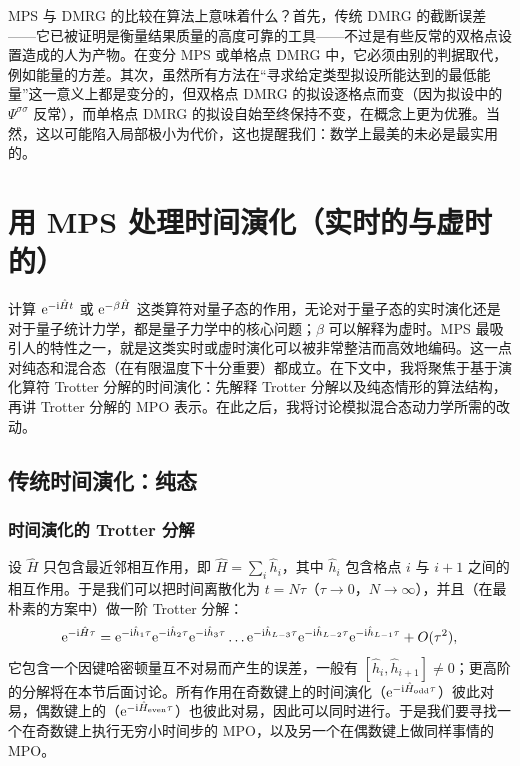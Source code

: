 \documentclass[a4paper,10pt,oneside,onecolumn,1p,times]{elsarticle}
\newcommand{\eul}{{\rm e }}
\newcommand{\imag}{{\rm i }}
\begin{document}
MPS 与 DMRG 的比较在算法上意味着什么？首先，传统 DMRG 的截断误差——它已被证明是衡量结果质量的高度可靠的工具——不过是有些反常的双格点设置造成的人为产物。在变分 MPS 或单格点 DMRG 中，它必须由别的判据取代，例如能量的方差。其次，虽然所有方法在``寻求给定类型拟设所能达到的最低能量''这一意义上都是变分的，但双格点 DMRG 的拟设逐格点而变（因为拟设中的 $\Psi^{\sigma\sigma}$ 反常），而单格点 DMRG 的拟设自始至终保持不变，在概念上更为优雅。当然，这以可能陷入局部极小为代价，这也提醒我们：数学上最美的未必是最实用的。
 
\section{用 MPS 处理时间演化（实时的与虚时的）}
计算 $\eul^{-\imag \hat{H}t}$ 或 $\eul^{-\beta\hat{H}}$ 这类算符对量子态的作用，无论对于量子态的实时演化还是对于量子统计力学，都是量子力学中的核心问题；$\beta$ 可以解释为虚时。MPS 最吸引人的特性之一，就是这类实时或虚时演化可以被非常整洁而高效地编码。这一点对纯态和混合态（在有限温度下十分重要）都成立。在下文中，我将聚焦于基于演化算符 Trotter 分解的时间演化\cite{Vidal03a,Vidal04b,Daley04,WhiteFeiguin04,VerstraeteRipoll04}：先解释 Trotter 分解以及纯态情形的算法结构，再讲 Trotter 分解的 MPO 表示。在此之后，我将讨论模拟混合态动力学所需的改动。
\subsection{传统时间演化：纯态}

\subsubsection{时间演化的 Trotter 分解}
设 $\hat{H}$ 只包含最近邻相互作用，即 $\hat{H} = \sum_i \hat{h}_i$，其中 $\hat{h}_i$ 包含格点 $i$ 与 $i+1$ 之间的相互作用。于是我们可以把时间离散化为 $t = N \tau$（$\tau\rightarrow 0$，$N \rightarrow \infty$），并且（在最朴素的方案中）做一阶 Trotter 分解：
\begin{equation}
\eul^{-\imag \hat{H}\tau} = \eul^{-\imag  \hat{h}_1 \tau}\eul^{-\imag  \hat{h}_2 \tau}\eul^{-\imag  \hat{h}_3 \tau} \ldots  \eul^{-\imag  \hat{h}_{L-3} \tau}\eul^{-\imag  \hat{h}_{L-2} \tau}\eul^{-\imag  \hat{h}_{L-1} \tau} + O(\tau^2),
\end{equation}
它包含一个因键哈密顿量互不对易而产生的误差，一般有 $[ \hat{h}_i,\hat{h}_{i+1}] \neq 0$；更高阶的分解将在本节后面讨论。所有作用在奇数键上的时间演化（$\eul^{-\imag \hat{H}_{{\rm odd}} \tau}$）彼此对易，偶数键上的（$\eul^{-\imag \hat{H}_{{\rm even}} \tau}$）也彼此对易，因此可以同时进行。于是我们要寻找一个在奇数键上执行无穷小时间步的 MPO，以及另一个在偶数键上做同样事情的 MPO。
\end{document}
